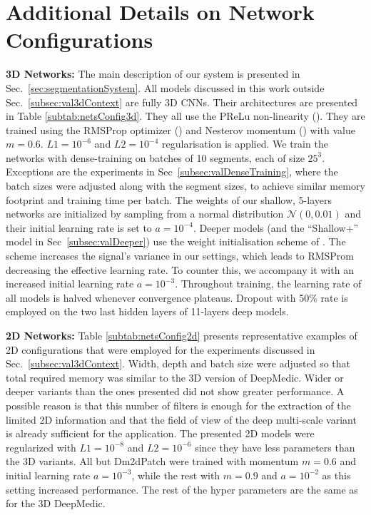 \documentclass[preprint,authoryear,12pt]{elsarticle}
\newcommand{\quot}[1]{``#1''}
\begin{document}
\section{Additional Details on Network Configurations}
\label{app:detailsConfig}

\textbf{3D Networks:} The main description of our system is presented in Sec.~\ref{sec:segmentationSystem}. All models discussed in this work outside Sec.~\ref{subsec:val3dContext} are fully 3D CNNs. Their architectures are presented in Table \ref{subtab:netsConfig3d}. They all use the PReLu non-linearity (\cite{he2015delving}). They are trained using the RMSProp optimizer (\cite{rmsProp}) and Nesterov momentum (\cite{sutskever2013importance}) with value $m=0.6$. $L1 = 10^{-6}$ and $L2 = 10^{-4}$ regularisation is applied. We train the networks with dense-training on batches of 10 segments, each of size $25^3$. Exceptions are the experiments in Sec~\ref{subsec:valDenseTraining}, where the batch sizes were adjusted along with the segment sizes, to achieve similar memory footprint and training time per batch. The weights of our shallow, 5-layers networks are initialized by sampling from a normal distribution $\mathcal{N}(0,0.01)$ and their initial learning rate is set to $a=10^{-4}$. Deeper models (and the \quot{Shallow+} model in Sec~\ref{subsec:valDeeper}) use the weight initialisation scheme of \cite{he2015delving}. The scheme increases the signal's variance in our settings, which leads to RMSProm decreasing the effective learning rate. To counter this, we accompany it with an increased initial learning rate $a = 10^{-3}$. Throughout training, the learning rate of all models is halved whenever convergence plateaus. Dropout with 50\% rate is employed on the two last hidden layers of 11-layers deep models.

\textbf{2D Networks:} Table \ref{subtab:netsConfig2d} presents representative examples of 2D configurations that were employed for the experiments discussed in Sec.~\ref{subsec:val3dContext}. Width, depth and batch size were adjusted so that total required memory was similar to the 3D version of DeepMedic. Wider or deeper variants than the ones presented did not show greater performance. A possible reason is that this number of filters is enough for the extraction of the limited 2D information and that the field of view of the deep multi-scale variant is already sufficient for the application. The presented 2D models were regularized with $L1 = 10^{-8}$ and $L2 = 10^{-6}$ since they have less parameters than the 3D variants. All but Dm2dPatch were trained with momentum $m=0.6$ and initial learning rate $a = 10^{-3}$, while the rest with $m=0.9$ and $a = 10^{-2}$ as this setting increased performance. The rest of the hyper parameters are the same as for the 3D DeepMedic.
\end{document}
